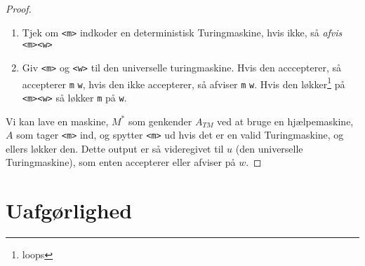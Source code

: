 \begin{proof}
\begin{enumerate}
  \item Tjek om \texttt{<m>} indkoder en deterministisk Turingmaskine, hvis ikke, så \textit{afvis} \texttt{<m><w>}
  \item Giv \texttt{<m>} og \texttt{<w>} til den universelle turingmaskine. Hvis den acccepterer, så accepterer \texttt{m} \texttt{w}, hvis den ikke accepterer, så afviser \texttt{m} \texttt{w}. Hvis den løkker\footnote{loops} på \texttt{<m><w>} så løkker \texttt{m} på \texttt{w}.
\end{enumerate}

Vi kan lave en maskine, $M^{*}$ som  genkender $A_{TM}$ ved at bruge en hjælpemaskine, $A$ som tager \texttt{<m>} ind, og spytter \texttt{<m>} ud hvis det er en valid Turingmaskine, og ellers løkker den. Dette output er så videregivet til $u$ (den universelle Turingmaskine), som enten accepterer eller afviser på $w$.

\end{proof}

\section{Uafgørlighed}%
\label{sec:undecidability}





